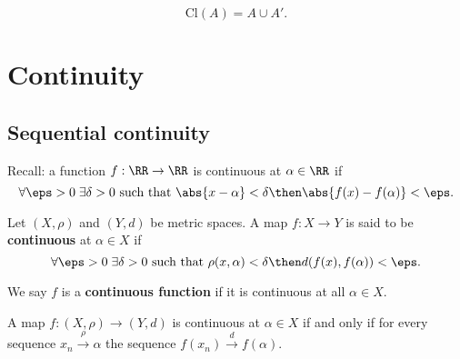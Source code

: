 \documentclass[12pt, a4paper]{article}
\begin{document}
\begin{mdthm}
    \[\text{Cl}(A) = A \cup A'.\]
\end{mdthm}

\section{Continuity}

\subsection{Sequential continuity}

Recall: a function \(f : \RR \to \RR\) is continuous at \(\alpha \in \RR\) if 
\[\forall \eps>0 \; \exists \delta>0 \text{ such that } \abs{x-\alpha} <\delta \then \abs{f(x)-f(\alpha)}<\eps.\]

\begin{definition}
    Let \((X,\rho)\) and \((Y,d)\) be metric spaces. A map \(f : X \to Y\) is said to be \textbf{continuous} at \(\alpha \in X\) if 
    \[\forall \eps>0 \; \exists \delta>0 \text{ such that } \rho(x,\alpha) <\delta \then d(f(x),f(\alpha))<\eps.\]
\end{definition}

\begin{definition}
    We say \(f\) is a \textbf{continuous function} if it is continuous at all \(\alpha \in X\).
\end{definition}

\begin{mdthm}
    A map \(f:(X,\rho) \to (Y,d)\) is continuous at \(\alpha \in X\) if and only if for every sequence \(x_n \xrightarrow{\rho} \alpha\) the sequence \(f(x_n) \xrightarrow{d} f(\alpha)\).
\end{mdthm}
\end{document}
